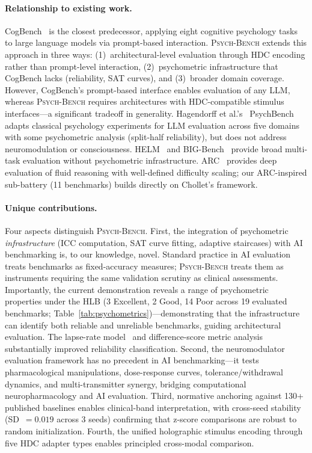 \documentclass[11pt,letterpaper]{article}
\newcommand{\psychbench}{\textsc{Psych-Bench}}
\newcommand{\hlb}{\textsc{HLB}}
\begin{document}
\paragraph{Relationship to existing work.} CogBench~\citep{codaforno2024cogbench} is the closest predecessor, applying eight cognitive psychology tasks to large language models via prompt-based interaction. \psychbench{} extends this approach in three ways: (1)~architectural-level evaluation through HDC encoding rather than prompt-level interaction, (2)~psychometric infrastructure that CogBench lacks (reliability, SAT curves), and (3)~broader domain coverage. However, CogBench's prompt-based interface enables evaluation of any LLM, whereas \psychbench{} requires architectures with HDC-compatible stimulus interfaces---a significant tradeoff in generality. Hagendorff et al.'s~\citep{hagendorff2023machine} PsychBench adapts classical psychology experiments for LLM evaluation across five domains with some psychometric analysis (split-half reliability), but does not address neuromodulation or consciousness. HELM~\citep{liang2023holistic} and BIG-Bench~\citep{srivastava2023beyond} provide broad multi-task evaluation without psychometric infrastructure. ARC~\citep{chollet2019measure} provides deep evaluation of fluid reasoning with well-defined difficulty scaling; our ARC-inspired sub-battery (11 benchmarks) builds directly on Chollet's framework.

\paragraph{Unique contributions.} Four aspects distinguish \psychbench{}. First, the integration of psychometric \emph{infrastructure} (ICC computation, SAT curve fitting, adaptive staircases) with AI benchmarking is, to our knowledge, novel. Standard practice in AI evaluation treats benchmarks as fixed-accuracy measures; \psychbench{} treats them as instruments requiring the same validation scrutiny as clinical assessments. Importantly, the current demonstration reveals a range of psychometric properties under the \hlb{} (3 Excellent, 2 Good, 14 Poor across 19 evaluated benchmarks; Table~\ref{tab:psychometrics})---demonstrating that the infrastructure can identify both reliable and unreliable benchmarks, guiding architectural evaluation. The lapse-rate model~\citep{wichmann2001psychometric} and difference-score metric analysis~\citep{cronbach1970essentials} substantially improved reliability classification. Second, the neuromodulator evaluation framework has no precedent in AI benchmarking---it tests pharmacological manipulations, dose-response curves, tolerance/withdrawal dynamics, and multi-transmitter synergy, bridging computational neuropharmacology and AI evaluation. Third, normative anchoring against 130+ published baselines enables clinical-band interpretation, with cross-seed stability (SD~$= 0.019$ across 3 seeds) confirming that z-score comparisons are robust to random initialization. Fourth, the unified holographic stimulus encoding through five HDC adapter types enables principled cross-modal comparison.
\end{document}
